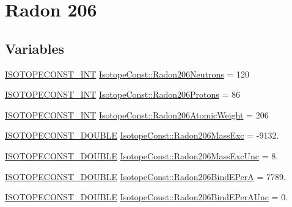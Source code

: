 \hypertarget{group___isotope_const-_radon-_rn206}{}\section{Radon 206}
\label{group___isotope_const-_radon-_rn206}
\subsection*{Variables}
\begin{DoxyCompactItemize}
\item 
\mbox{\hyperlink{group___isotope_const-_macros_ga5f18360b3e99483a35c32d789e62621c}{I\+S\+O\+T\+O\+P\+E\+C\+O\+N\+S\+T\+\_\+\+I\+NT}} \mbox{\hyperlink{group___isotope_const-_radon-_rn206_gafc6eaea258384fe59030fa00d54cac9f}{Isotope\+Const\+::\+Radon206\+Neutrons}} = 120
\item 
\mbox{\hyperlink{group___isotope_const-_macros_ga5f18360b3e99483a35c32d789e62621c}{I\+S\+O\+T\+O\+P\+E\+C\+O\+N\+S\+T\+\_\+\+I\+NT}} \mbox{\hyperlink{group___isotope_const-_radon-_rn206_ga9bf100e58421125b1e86c863d498a062}{Isotope\+Const\+::\+Radon206\+Protons}} = 86
\item 
\mbox{\hyperlink{group___isotope_const-_macros_ga5f18360b3e99483a35c32d789e62621c}{I\+S\+O\+T\+O\+P\+E\+C\+O\+N\+S\+T\+\_\+\+I\+NT}} \mbox{\hyperlink{group___isotope_const-_radon-_rn206_gafbe081794861c2b20da89e9e80604460}{Isotope\+Const\+::\+Radon206\+Atomic\+Weight}} = 206
\item 
\mbox{\hyperlink{group___isotope_const-_macros_ga8f45a7272ce02c0b4c65c44636ed719a}{I\+S\+O\+T\+O\+P\+E\+C\+O\+N\+S\+T\+\_\+\+D\+O\+U\+B\+LE}} \mbox{\hyperlink{group___isotope_const-_radon-_rn206_gac6352b28b325f5c720ab0ae353881409}{Isotope\+Const\+::\+Radon206\+Mass\+Exc}} = -\/9132.
\item 
\mbox{\hyperlink{group___isotope_const-_macros_ga8f45a7272ce02c0b4c65c44636ed719a}{I\+S\+O\+T\+O\+P\+E\+C\+O\+N\+S\+T\+\_\+\+D\+O\+U\+B\+LE}} \mbox{\hyperlink{group___isotope_const-_radon-_rn206_gacb71ef432f44483bc2ad454f6412c11a}{Isotope\+Const\+::\+Radon206\+Mass\+Exc\+Unc}} = 8.
\item 
\mbox{\hyperlink{group___isotope_const-_macros_ga8f45a7272ce02c0b4c65c44636ed719a}{I\+S\+O\+T\+O\+P\+E\+C\+O\+N\+S\+T\+\_\+\+D\+O\+U\+B\+LE}} \mbox{\hyperlink{group___isotope_const-_radon-_rn206_gaefa1b4e36f5ec61c25be4b5dcdbc31e9}{Isotope\+Const\+::\+Radon206\+Bind\+E\+PerA}} = 7789.
\item 
\mbox{\hyperlink{group___isotope_const-_macros_ga8f45a7272ce02c0b4c65c44636ed719a}{I\+S\+O\+T\+O\+P\+E\+C\+O\+N\+S\+T\+\_\+\+D\+O\+U\+B\+LE}} \mbox{\hyperlink{group___isotope_const-_radon-_rn206_ga8de55ccff492df2407c589df7fe52274}{Isotope\+Const\+::\+Radon206\+Bind\+E\+Per\+A\+Unc}} = 0.

\end{DoxyCompactItemize}
